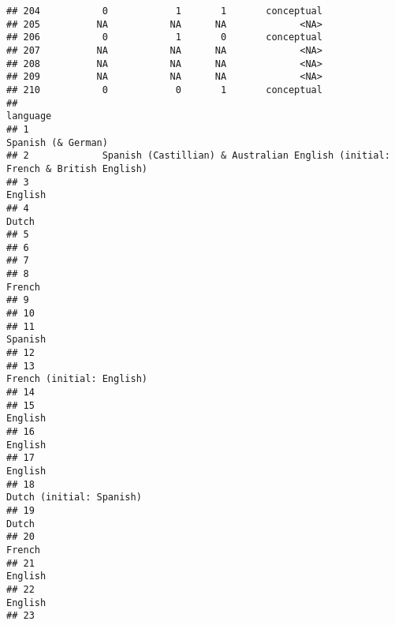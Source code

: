 \documentclass[
  english,
  man]{apa6}
\begin{document}
\begin{verbatim}
## 204           0            1       1       conceptual
## 205          NA           NA      NA             <NA>
## 206           0            1       0       conceptual
## 207          NA           NA      NA             <NA>
## 208          NA           NA      NA             <NA>
## 209          NA           NA      NA             <NA>
## 210           0            0       1       conceptual
##                                                                                    language
## 1                                                                        Spanish (& German)
## 2             Spanish (Castillian) & Australian English (initial: French & British English)
## 3                                                                                   English
## 4                                                                                     Dutch
## 5                                                                                          
## 6                                                                                          
## 7                                                                                          
## 8                                                                                    French
## 9                                                                                          
## 10                                                                                         
## 11                                                                                  Spanish
## 12                                                                                         
## 13                                                                French (initial: English)
## 14                                                                                         
## 15                                                                                  English
## 16                                                                                  English
## 17                                                                                  English
## 18                                                                 Dutch (initial: Spanish)
## 19                                                                                    Dutch
## 20                                                                                   French
## 21                                                                                  English
## 22                                                                                  English
## 23                                                                                         

\end{verbatim}
\end{document}
